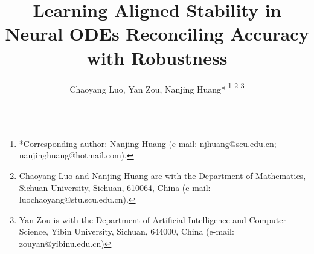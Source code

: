\documentclass[journal]{IEEEtran}
\begin{document}
\newtheorem{lemma}{Lemma}
\newtheorem{proposition}{Proposition}
\newtheorem{definition}{Definition}
\newtheorem{theorem}{Theorem}
\newtheorem{assumption}{Assumption}
\title{Learning Aligned Stability in Neural ODEs Reconciling Accuracy with Robustness}

\author{ Chaoyang Luo, Yan Zou, Nanjing Huang{*}
	\thanks{*Corresponding author: Nanjing Huang (e-mail: njhuang@scu.edu.cn; nanjinghuang@hotmail.com).}
	\thanks{Chaoyang Luo and Nanjing Huang are with the Department of Mathematics, Sichuan University, Sichuan, 610064, China (e-mail: luochaoyang@stu.scu.edu.cn).}
	\thanks{Yan Zou is with the Department of Artificial Intelligence and Computer Science, Yibin University, Sichuan, 644000, China (e-mail: zouyan@yibinu.edu.cn) }
	}
\maketitle
%


\end{document}
